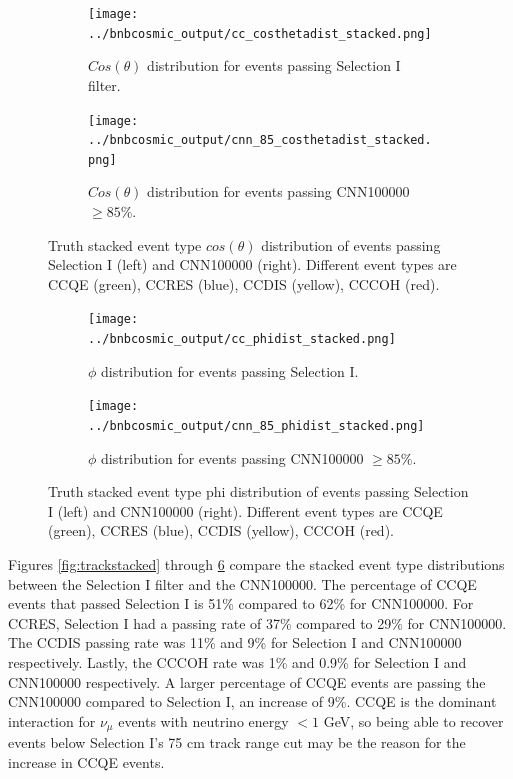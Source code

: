 \begin{figure}[htp!]
\centering
	\begin{subfigure}[b]{.475\textwidth}
	\centering
		\texttt{[image: ../bnbcosmic\_output/cc\_costhetadist\_stacked.png]}
		\caption{$Cos(\theta)$ distribution for events passing Selection I filter.} 
		\label{fig:cccosthetastacked}
	\end{subfigure}
	\quad
	\begin{subfigure}[b]{.475\textwidth}
	\centering
		\texttt{[image: ../bnbcosmic\_output/cnn\_85\_costhetadist\_stacked.png]}
		\caption{$Cos(\theta)$ distribution for events passing CNN100000 $\geq 85\%$.} 
		\label{fig:cnn85costhetastacked}
	\end{subfigure}
\caption{Truth stacked event type $cos(\theta)$ distribution of events passing Selection I (left) and CNN100000 (right). Different event types are CCQE (green), CCRES (blue), CCDIS (yellow), CCCOH (red).}
\label{fig:costhetastacked}
\end{figure}

\begin{figure}[htp!]
\centering
	\begin{subfigure}[b]{.475\textwidth}
	\centering
		\texttt{[image: ../bnbcosmic\_output/cc\_phidist\_stacked.png]}
		\caption{$\phi$ distribution for events passing Selection I.} 
		\label{fig:ccphistacked}
	\end{subfigure}
	\quad
	\begin{subfigure}[b]{.475\textwidth}
	\centering
		\texttt{[image: ../bnbcosmic\_output/cnn\_85\_phidist\_stacked.png]}
		\caption{$\phi$ distribution for events passing CNN100000 $\geq 85\%$.} 
		\label{fig:cnn85phistacked}
	\end{subfigure}
\caption{Truth stacked event type phi distribution of events passing Selection I (left) and CNN100000 (right). Different event types are CCQE (green), CCRES (blue), CCDIS (yellow), CCCOH (red).}
\label{fig:phistacked}
\end{figure}
Figures \ref{fig:trackstacked} through \ref{fig:phistacked} compare the stacked event type distributions between the Selection I filter and the CNN100000. The percentage of CCQE events that passed Selection I is 51\% compared to 62\% for CNN100000. For CCRES, Selection I had a passing rate of 37\% compared to 29\% for CNN100000. The CCDIS passing rate was 11\% and 9\% for Selection I and CNN100000 respectively. Lastly, the CCCOH rate was 1\% and 0.9\% for Selection I and CNN100000 respectively. A larger percentage of CCQE events are passing the CNN100000 compared to Selection I, an increase of 9\%. CCQE is the dominant interaction for $\nu_{\mu}$ events with neutrino energy $<1$ GeV, so being able to recover events below Selection I's 75 cm track range cut may be the reason for the increase in CCQE events. 
  
